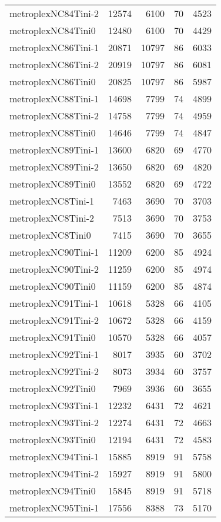 \begin{longtable}{lrrrr}
metroplexNC84Tini-2 & 12574 & 6100 & 70 & 4523 \\
metroplexNC84Tini0 & 12480 & 6100 & 70 & 4429 \\
metroplexNC86Tini-1 & 20871 & 10797 & 86 & 6033 \\
metroplexNC86Tini-2 & 20919 & 10797 & 86 & 6081 \\
metroplexNC86Tini0 & 20825 & 10797 & 86 & 5987 \\
metroplexNC88Tini-1 & 14698 & 7799 & 74 & 4899 \\
metroplexNC88Tini-2 & 14758 & 7799 & 74 & 4959 \\
metroplexNC88Tini0 & 14646 & 7799 & 74 & 4847 \\
metroplexNC89Tini-1 & 13600 & 6820 & 69 & 4770 \\
metroplexNC89Tini-2 & 13650 & 6820 & 69 & 4820 \\
metroplexNC89Tini0 & 13552 & 6820 & 69 & 4722 \\
metroplexNC8Tini-1 & 7463 & 3690 & 70 & 3703 \\
metroplexNC8Tini-2 & 7513 & 3690 & 70 & 3753 \\
metroplexNC8Tini0 & 7415 & 3690 & 70 & 3655 \\
metroplexNC90Tini-1 & 11209 & 6200 & 85 & 4924 \\
metroplexNC90Tini-2 & 11259 & 6200 & 85 & 4974 \\
metroplexNC90Tini0 & 11159 & 6200 & 85 & 4874 \\
metroplexNC91Tini-1 & 10618 & 5328 & 66 & 4105 \\
metroplexNC91Tini-2 & 10672 & 5328 & 66 & 4159 \\
metroplexNC91Tini0 & 10570 & 5328 & 66 & 4057 \\
metroplexNC92Tini-1 & 8017 & 3935 & 60 & 3702 \\
metroplexNC92Tini-2 & 8073 & 3934 & 60 & 3757 \\
metroplexNC92Tini0 & 7969 & 3936 & 60 & 3655 \\
metroplexNC93Tini-1 & 12232 & 6431 & 72 & 4621 \\
metroplexNC93Tini-2 & 12274 & 6431 & 72 & 4663 \\
metroplexNC93Tini0 & 12194 & 6431 & 72 & 4583 \\
metroplexNC94Tini-1 & 15885 & 8919 & 91 & 5758 \\
metroplexNC94Tini-2 & 15927 & 8919 & 91 & 5800 \\
metroplexNC94Tini0 & 15845 & 8919 & 91 & 5718 \\
metroplexNC95Tini-1 & 17556 & 8388 & 73 & 5170 \\

\end{longtable}
